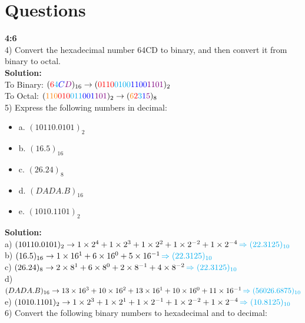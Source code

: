 \documentclass[a4paper,12pt]{extarticle}
\begin{document}
\section*{\LARGE Questions }\textbf{\LARGE {4:6}}\\[0.5cm]
4) Convert the hexadecimal number 64CD to binary, and then convert it from binary to octal.\\[0.4cm]
{\color{blue}\textbf{Solution:}}\\[0.3cm]
\indent To Binary:
 $\color{black} ({\color{red}6}{\color{cyan}4}{\color{blue}C}{\color{violet}D})_{16} \rightarrow ({\color{red}0110}{\color{cyan}0100}{\color{blue}1100}{\color{violet}1101})_{2}$\\[0.2cm]
\indent To Octal: $({\color{orange}110}{\color{red}010}{\color{cyan}011}{\color{blue}001}{\color{violet}101})_{2} \rightarrow ({\color{orange}6}{\color{red}2}{\color{cyan}3}{\color{blue}1}{\color{violet}5})_{8}$\\[1cm]
5) Express the following numbers in decimal:
\begin{itemize}
\item a. $(10110.0101)_2$
\item b. $(16.5)_{16}$
\item c. $(26.24)_8$
\item d. $(DADA.B)_{16}$
\item e. $(1010.1101)_{2}$
\end{itemize}
{\color{blue}\textbf{Solution:}}\\[0.3cm]
\indent \color{red} a) \color{black} $(10110.0101)_2 \rightarrow 1 \times 2^4 + 1 \times 2^3 +1 \times 2^2 + 1 \times 2^{-2} +1 \times 2^{-4} \, { \color{cyan} \Rightarrow (22.3125)_{10}}$\\[0.2cm]
\indent \color{red} b) \color{black} $(16.5)_{16} \rightarrow 1 \times 16^1 + 6 \times 16^0 +5 \times 16^{-1} \, { \color{cyan} \Rightarrow (22.3125)_{10}}$\\[0.2cm]
\indent \color{red} c) \color{black} $(26.24)_{8} \rightarrow 2 \times 8^1 + 6 \times 8^0 +2 \times 8^{-1} + 4 \times 8^{-2} \, { \color{cyan} \Rightarrow (22.3125)_{10}}$\\[0.2cm]
\indent \color{red} d) \color{black} $(DADA.B)_{16} \rightarrow 13 \times 16^3 + 10 \times 16^2 +13 \times 16^{1} + 10 \times 16^0 + 11 \times 16^{-1} \, { \color{cyan} \Rightarrow (56026.6875)_{10}}$\\[0.2cm]
\indent \color{red} e) \color{black} $(1010.1101)_{2} \rightarrow 1 \times 2^3 + 1 \times 2^1 +1 \times 2^{-1} + 1 \times 2^{-2} + 1 \times 2^{-4} \, { \color{cyan} \Rightarrow (10.8125)_{10}}$\\[1cm]
6) Convert the following binary numbers to hexadecimal and to decimal:
\end{document}
